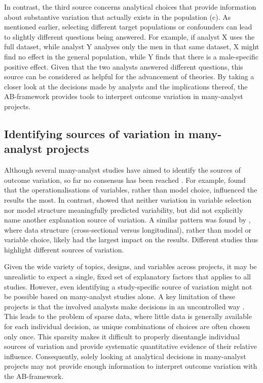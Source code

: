 \documentclass{article}
\begin{document}
In contrast, the third source concerns analytical choices that provide information about substantive variation that actually exists in the population (c). As mentioned earlier, selecting different target populations or confounders can lead to slightly different questions being answered. For example, if analyst X uses the full dataset, while analyst Y analyses only the men in that same dataset, X might find no effect in the general population, while Y finds that there is a male-specific positive effect. Given that the two analysts answered different questions, this source can be considered as helpful for the advancement of theories. By taking a closer look at the decisions made by analysts and the implications thereof, the AB-framework provides tools to interpret outcome variation in many-analyst projects.

\subsection*{Identifying sources of variation in many-analyst projects}
Although several many-analyst studies have aimed to identify the sources of outcome variation, so far no consensus has been reached \citep[e.g.,][]{silberzahn_many_2018, bastiaansen_time_2020,breznau_observing_2022,hoogeveen_many-analysts_2023, gould_same_2025, kowall_marital_2025}. For example, \citet{hoogeveen_many-analysts_2023} found that the operationalisations of variables, rather than model choice,  influenced the results the most. In contrast, \citet{gould_same_2025} showed that neither variation in variable selection nor model structure meaningfully predicted variability, but did not explicitly name another explanation source of variation. A similar pattern was found by \citet{kowall_marital_2025}, where data structure (cross-sectional versus longitudinal), rather than model or variable choice, likely had the largest impact on the results. Different studies thus highlight different sources of variation. 

Given the wide variety of topics, designs, and variables across projects, it may be unrealistic to expect a single, fixed set of explanatory factors that applies to all studies. However, even identifying a study-specific source of variation might not be possible based on many-analyst studies alone. A key limitation of these projects is that the involved analysts make decisions in an uncontrolled way \citep{kummerfeld_one_2023}. This leads to the problem of sparse data, where little data is generally available for each individual decision, as unique combinations of choices are often chosen only once. This sparsity makes it difficult to properly disentangle individual sources of variation and provide systematic quantitative evidence of their relative influence. Consequently, solely looking at analytical decisions in many-analyst projects may not provide enough information to interpret outcome variation with the AB-framework.
\end{document}
